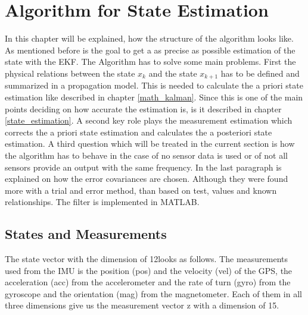 \section{Algorithm for State Estimation}
In this chapter will be explained, how the structure of the algorithm looks like. As mentioned before is the goal to get a as precise as possible estimation of the state with the EKF. The Algorithm has to solve some main problems. First the physical relations between the state $x_{k}$ and the state $x_{k+1}$ has to be defined and summarized in a propagation model. This is needed to calculate the a priori state estimation like described in chapter \ref{math_kalman}. Since this is one of the main points deciding on how accurate the estimation is, is it described in chapter \ref{state_estimation}. A second key role plays the measurement estimation which corrects the a priori state estimation and calculates the a posteriori state estimation. A third question which will be treated in the current section is how the algorithm has to behave in the case of no sensor data is used or of not all sensors provide an output with the same frequency. In the last paragraph is explained on how the error covariances are chosen. Although they were found more with a trial and error method, than based on test, values and known relationships.
The filter is implemented in MATLAB.

\subsection*{States and Measurements}
The state vector with the dimension of 12looks as follows. The measurements used from the IMU is the position (pos) and the velocity (vel) of the GPS, the acceleration (acc) from the accelerometer and the rate of turn (gyro) from the gyroscope and the orientation (mag) from the magnetometer. Each of them in all three dimensions give us the measurement vector z with a dimension of 15.

